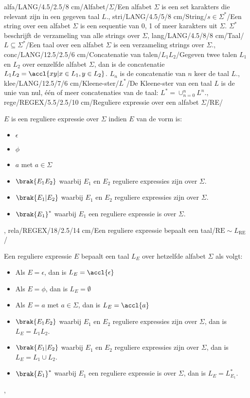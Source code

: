 alfa/LANG/4.5/2.5/8 cm/Alfabet/{$\Sigma$}/{Een alfabet $\Sigma$ is een set karakters die relevant zijn in een gegeven taal $L$.},
stri/LANG/4.5/5/8 cm/String/{$s\in\Sigma^*$}/{Een string over een alfabet $\Sigma$ is een sequentie van 0, 1 of meer karakters uit $\Sigma$. $\Sigma^*$ beschrijft de verzameling van alle strings over $\Sigma$},
lang/LANG/4.5/8/8 cm/Taal/{$L\subseteq\Sigma^*$}/{Een taal over een alfabet $\Sigma$ is een verzameling strings over $\Sigma$.},
conc/LANG/12.5/2.5/6 cm/Concatenatie van talen/{$L_1L_2$}/{Gegeven twee talen $L_1$ en $L_2$ over eenzelfde alfabet $\Sigma$, dan is de concatenatie $L_1L_2=\accl{xy|x\in L_1,y\in L_2}$. $L_n$ is de concatenatie van $n$ keer de taal $L$.},
klee/LANG/12.5/7/6 cm/Kleene-ster/{$L^*$}/{De Kleene-ster van een taal $L$ is de unie van nul, \'e\'en of meer concatenaties van de taal: $L^*=\displaystyle\cup_{n=0}^n{L^n}$.},
rege/REGEX/5.5/2.5/10 cm/Reguliere expressie over een alfabet $\Sigma$/RE/{$E$ is een reguliere expressie over $\Sigma$ indien $E$ van de vorm is:\begin{itemize}
 \item $\epsilon$
 \item $\phi$
 \item $a$ met $a\in\Sigma$
 \item $\brak{E_1E_2}$ waarbij $E_1$ en $E_2$ reguliere expressies zijn over $\Sigma$.
 \item $\brak{E_1|E_2}$ waarbij $E_1$ en $E_2$ reguliere expressies zijn over $\Sigma$.
 \item $\brak{E_1}^*$ waarbij $E_1$ een reguliere expressie is over $\Sigma$.
\end{itemize}},
rela/REGEX/18/2.5/14 cm/Een reguliere expressie bepaalt een taal/$\mbox{RE}\sim L_{\mbox{RE}}$/{Een reguliere expressie $E$ bepaalt een taal $L_E$ over hetzelfde alfabet $\Sigma$ als volgt:\begin{itemize}
 \item Als $E=\epsilon$, dan is $L_E=\accl{\epsilon}$
 \item Als $E=\phi$, dan is $L_E=\emptyset$
 \item Als $E=a$ met $a\in\Sigma$, dan is $L_E=\accl{a}$
 \item $\brak{E_1E_2}$ waarbij $E_1$ en $E_2$ reguliere expressies zijn over $\Sigma$, dan is $L_E=L_1L_2$.
 \item $\brak{E_1|E_2}$ waarbij $E_1$ en $E_2$ reguliere expressies zijn over $\Sigma$, dan is $L_E=L_1\cup L_2$.
 \item $\brak{E_1}^*$ waarbij $E_1$ een reguliere expressie is over $\Sigma$, dan is $L_E=L_{E_1}^*$.
\end{itemize}},
